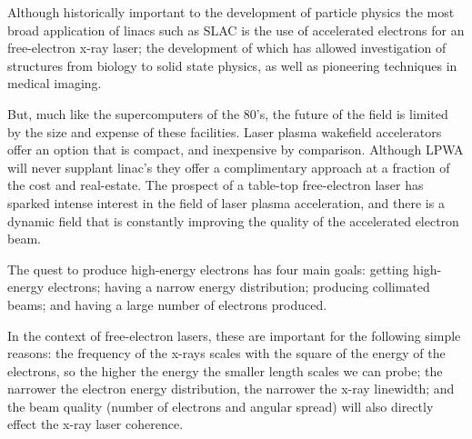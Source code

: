 \documentclass[12pt,letter]{article}
\begin{document}
 Although historically important to the development of particle
 physics the most broad application of linacs such as SLAC is the use of
 accelerated electrons for an free-electron x-ray laser; the development of
 which has allowed investigation of structures from biology to solid state
 physics, as well as pioneering techniques in medical imaging.\cite{o2001free}
 

 But, much like the supercomputers of the 80's, the future of the field is limited by the size and expense of these
 facilities. Laser plasma
 wakefield accelerators offer an option that is compact, and inexpensive by
 comparison. Although LPWA will never supplant linac's they offer a complimentary approach at a
 fraction of the cost and real-estate. The prospect of a table-top free-electron
 laser has sparked intense interest in the field of laser plasma acceleration,
 and there is a dynamic field that is constantly improving the quality of the
 accelerated electron beam.


 The quest to produce high-energy electrons has four main goals: getting
  high-energy electrons; having a narrow energy distribution; producing collimated beams; and having a large number of electrons
 produced.

 In the context of free-electron lasers, these are important for the following
 simple reasons: the frequency of the x-rays scales with the square of the
 energy of the electrons, so the higher the energy the smaller length scales we
 can probe; the narrower the electron energy distribution, the narrower the
 x-ray linewidth; and the beam quality (number of electrons and angular spread)
 will also directly effect the x-ray laser coherence.
\end{document}
